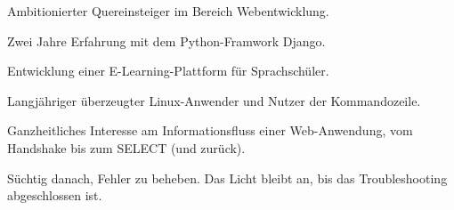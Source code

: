 
\begin{cvparagraph}


  Ambitionierter Quereinsteiger im Bereich Webentwicklung.

  Zwei Jahre Erfahrung mit dem Python-Framwork Django.

  Entwicklung einer E-Learning-Plattform für Sprachschüler.

  Langjähriger überzeugter Linux-Anwender und Nutzer der Kommandozeile.

  Ganzheitliches Interesse am Informationsfluss einer Web-Anwendung, vom Handshake bis zum SELECT (und zurück).

  Süchtig danach, Fehler zu beheben. Das Licht bleibt an, bis das Troubleshooting abgeschlossen ist.






\end{cvparagraph}
